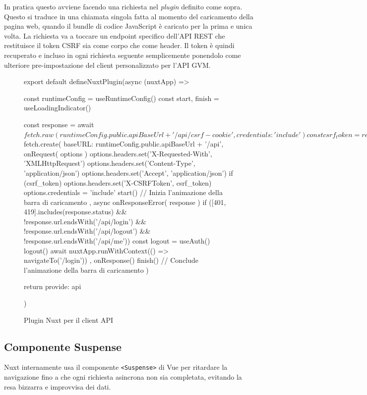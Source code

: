 In pratica questo avviene facendo una richiesta nel \emph{plugin} definito come sopra. Questo si traduce in una chiamata singola fatta al momento del caricamento della pagina web, quando il bundle di codice JavaScript è caricato per la prima e unica volta. La richiesta va a toccare un endpoint specifico dell'API REST che restituisce il token CSRF sia come corpo che come header. Il token è quindi recuperato e incluso in ogni richiesta seguente semplicemente ponendolo come ulteriore pre-impostazione del client personalizzato per l'API GVM.

\begin{figure}
\centering
\begin{jscode}
export default defineNuxtPlugin(async (nuxtApp) => {
  const runtimeConfig = useRuntimeConfig()
  const {start, finish} = useLoadingIndicator()

  const response = await $fetch.raw(runtimeConfig.public.apiBaseUrl + '/api/csrf-cookie', {credentials: 'include'})
  const csrf_token = response.headers.get('X-CSRFToken')

  const api = $fetch.create({
    baseURL: runtimeConfig.public.apiBaseUrl + '/api',
    onRequest({ options }) {
      options.headers.set('X-Requested-With', 'XMLHttpRequest')
      options.headers.set('Content-Type', 'application/json')
      options.headers.set('Accept', 'application/json')
      if (csrf_token) {
        options.headers.set('X-CSRFToken', csrf_token)
      }
      options.credentials = 'include'
      start() // Inizia l'animazione della barra di caricamento
    },
    async onResponseError({ response }) {
      if ([401, 419].includes(response.status) && !response.url.endsWith('/api/login') && !response.url.endsWith('/api/logout') && !response.url.endsWith('/api/me')) {
        const {logout} = useAuth()
        logout()
        await nuxtApp.runWithContext(() => navigateTo('/login'))
      }
    },
    onResponse() {
      finish() // Conclude l'animazione della barra di caricamento
    }
  })

  return {
    provide: {
      api
    }
  }
})
\end{jscode}
\caption{Plugin Nuxt per il client API}
\end{figure}

\subsection{Componente Suspense}
Nuxt internamente usa il componente \texttt{<Suspense>} di Vue per ritardare la navigazione fino a che ogni richiesta asincrona non sia completata, evitando la resa bizzarra e improvvisa dei dati.

